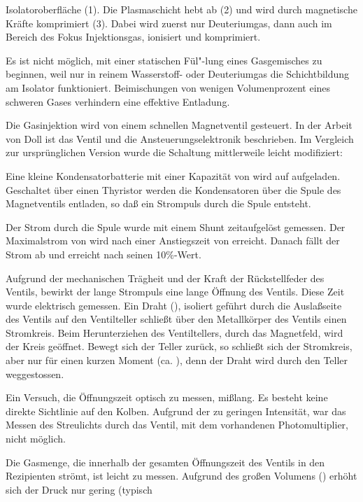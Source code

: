 Isolatoroberfläche (1). Die Plasmaschicht hebt ab  (2) und wird durch
magnetische Kräfte komprimiert (3). Dabei wird zuerst nur Deuteriumgas,
dann auch im Bereich des Fokus Injektionsgas, ionisiert und
komprimiert.
\par
Es ist nicht möglich, mit einer statischen Fül"-lung eines
Gasgemisches zu beginnen, weil nur in reinem Wasserstoff- oder
Deuteriumgas die Schichtbildung am Isolator funktioniert.
Beimischungen von wenigen Volumenprozent eines schweren Gases
verhindern eine effektive Entladung.
\par
Die Gasinjektion wird von einem schnellen Magnetventil gesteuert. In
der Arbeit von Doll \cite{doll:diplom} ist das Ventil und die
Ansteuerungselektronik beschrieben. Im Vergleich zur ursprünglichen
Version wurde die Schaltung mittlerweile leicht modifiziert:
\par
Eine kleine Kondensatorbatterie mit einer Kapazität von
 wird auf  aufgeladen. Geschaltet über
einen Thyristor werden die Kondensatoren über die Spule des
Magnetventils entladen, so daß ein Strompuls durch die Spule entsteht.
\par
Der Strom durch die Spule wurde mit einem Shunt zeitaufgelöst gemessen. Der
Maximalstrom von  wird nach einer Anstiegszeit von 
erreicht. Danach fällt der Strom ab und erreicht nach  seinen
10\%-Wert.
\par
Aufgrund der mechanischen Trägheit und der Kraft der
Rückstellfeder des Ventils, bewirkt der  lange
Strompuls eine  lange Öffnung des Ventils. Diese Zeit
wurde elektrisch gemessen. Ein Draht (),
isoliert geführt durch die Auslaßseite des Ventils auf den
Ventilteller schließt über den Metallkörper des Ventils einen
Stromkreis. Beim Herunterziehen des Ventiltellers, durch das
Magnetfeld, wird der Kreis geöffnet. Bewegt sich der Teller
zurück, so schließt sich der Stromkreis, aber nur für einen kurzen
Moment (ca. ), denn der Draht wird durch den Teller
weggestossen.
\par
Ein Versuch, die Öffnungszeit optisch zu messen, mißlang. Es besteht
keine direkte Sichtlinie auf den Kolben. Aufgrund der zu geringen
Intensität, war das Messen des Streulichts durch das Ventil, mit dem
vorhandenen Photomultiplier, nicht möglich.
\par
Die Gasmenge, die innerhalb der gesamten Öffnungszeit des Ventils in
den Rezipienten strömt, ist leicht zu messen. Aufgrund des großen
Volumens () erhöht sich der Druck nur gering (typisch
